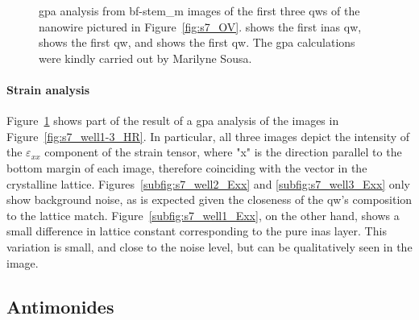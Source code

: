 \begin{figure}
{    }
    \caption[\acs{gpa} analysis from \acs{bf}-\acs{stem_m} images of the first three \acl{qw}s of the nanowire cross-section cut from sample 7.]{\acs{gpa} analysis from \acs{bf}-\acs{stem_m} images of the first three \acl{qw}s of the nanowire pictured in Figure~\ref{fig:s7_OV}.  shows the first \acs{inas} \acl{qw},  shows the first  \acl{qw}, and  shows the first  \acl{qw}. The \acs{gpa} calculations were kindly carried out by Marilyne Sousa.}
    \label{fig:s7_GPA}
\end{figure}

\paragraph{Strain analysis} Figure~\ref{fig:s7_GPA} shows part of the result of a \acf{gpa} analysis of the images in Figure~\ref{fig:s7_well1-3_HR}. In particular, all three images depict the intensity of the $\varepsilon_{xx}$ component of the strain tensor, where "x" is the direction parallel to the bottom margin of each image, therefore coinciding with the  vector in the crystalline lattice. Figures~\ref{subfig:s7_well2_Exx} and \ref{subfig:s7_well3_Exx} only show background noise, as is expected given the closeness of the \acs{qw}'s composition to the lattice match. Figure~\ref{subfig:s7_well1_Exx}, on the other hand, shows a small difference in lattice constant corresponding to the pure \acs{inas} layer. This variation is small, and close to the noise level, but can be qualitatively seen in the image.

\subsection{Antimonides}

